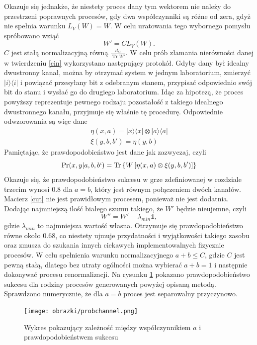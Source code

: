 \documentclass[10pt]{article} %
\DeclareMathOperator{\Trs}{Tr}
\newcommand{\Ket}[1]{|#1\rangle}
\newcommand{\Bra}[1]{\langle#1|}
\newcommand{\I}{\mathbb{1}}
\begin{document}
Okazuje się jednakże, że niestety proces dany tym wektorem nie należy do przestrzeni poprawnych procesów, gdy dwa współczynniki są różne od zera, gdyż nie spełnia warunku $L_V(W) = W$. W celu uratowania tego wybornego pomysłu spróbowano wziąć 
\begin{equation}
\label{cut}
W' = CL_V(W).
\end{equation}
$C$ jest stałą normalizacyjną równą $\frac{d_O}{\Trs W'}$.
W celu prób złamania nierówności danej w twierdzeniu \ref{cin} wykorzystano następujący protokół. Gdyby dany był idealny dwustronny kanał, można by otrzymać system w jednym laboratorium, zmierzyć $\Ket{i}\Bra{i}$ i powiązać przesyłany bit z odebranym stanem, przypisać odpowiednio swój bit do stanu i wysłać go do drugiego laboratorium. Idąc za hipotezą, że proces powyższy reprezentuje pewnego rodzaju pozostałość z takiego idealnego dwustronnego kanału, przyjmuje się właśnie tę procedurę. Odpowiednie odwzorowania są więc dane
\begin{gather}
\eta(x,a) = \Ket{x}\Bra{x} \otimes \Ket{a}\Bra{a} \\
\xi(y,b,b') = \eta(y,b)
\end{gather}
Pamiętając, że prawdopodobieństwo jest dane jak zazwyczaj, czyli
\begin{equation}
\Pr(x,y|a,b,b`) = \Trs\left\{{W\left[\eta(x,a) \otimes \xi(y,b,b') \right]}\right\}
\end{equation}
Okazuje się, że prawdopodobieństwo sukcesu w grze zdefiniowanej w rozdziale trzecim wynosi $0.8$ dla $a=b$, który jest równym połączeniem dwóch kanałów.
Macierz \eqref{cut} nie jest prawidłowym procesem, ponieważ nie jest dodatnia. Dodając najmniejszą ilość białego szumu takiego, że $W'$ będzie nieujemne, czyli
\begin{equation}
W'' = W' - \lambda_{min} \I,
\end{equation} gdzie $\lambda_{min}$ to najmniejsza wartość własna.
Otrzymuje się prawdopodobieństwo równe około $0.68$, co niestety ujmuje przydatności i wyjątkowości takiego zasobu oraz zmusza do szukania innych ciekawych implementowalnych fizycznie procesów.
W celu spelnienia warunku normalizacyjnego $a + b \leq C$, gdzie $C$ jest pewną stałą, dlatego bez utraty ogólności można wybierać $a + b = 1$ i następnie dokonywać procesu renormalizacji. Na rysunku \ref{fig:bichannel} pokazano prawdopodobieństwo sukcesu dla rodziny procesów generowanych powyżej opisaną metodą. Sprawdzono numerycznie, że dla $a = b$ proces jest separowalny przyczynowo.
\begin{figure}[t]
\centering
\texttt{[image: obrazki/probchannel.png]}
\caption{Wykres pokazujący zależność między współczynnikiem $a$ i prawdopodobieństwem sukcesu}
\label{fig:bichannel}
\end{figure}
\end{document}

